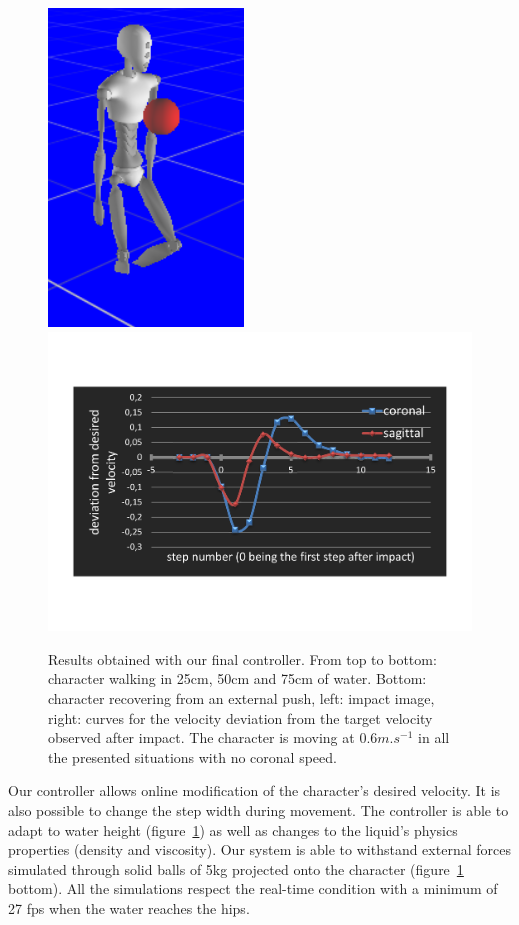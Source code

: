 \documentclass[conference]{acmsiggraph}
\begin{document}
\begin{figure}[t]
\includegraphics[scale=0.28]{images/strips/ball/img_impact.png}
\includegraphics[scale=0.255]{images/strips/ball/speed_evo_after_impact.pdf}
\caption{Results obtained with our final controller. From top to bottom: character walking in 25cm, 50cm and 75cm of water. Bottom: character recovering from an external push, left: impact image, right: curves for the velocity deviation from the target velocity observed after impact. The character is moving at $0.6m.s^{-1}$ in all the presented situations with no coronal speed.}
\label{fig:controller_results}
\end{figure}

Our controller allows online modification of the character's desired velocity. It is also possible to change the step width during movement. The controller is able to adapt to water height (figure~\ref{fig:controller_results}) as well as changes to the liquid's physics properties (density and viscosity). Our system is able to withstand external forces simulated through solid balls of 5kg projected onto the character (figure~\ref{fig:controller_results} bottom). All the simulations respect the real-time condition with a minimum of 27 fps when the water reaches the hips.
\end{document}
